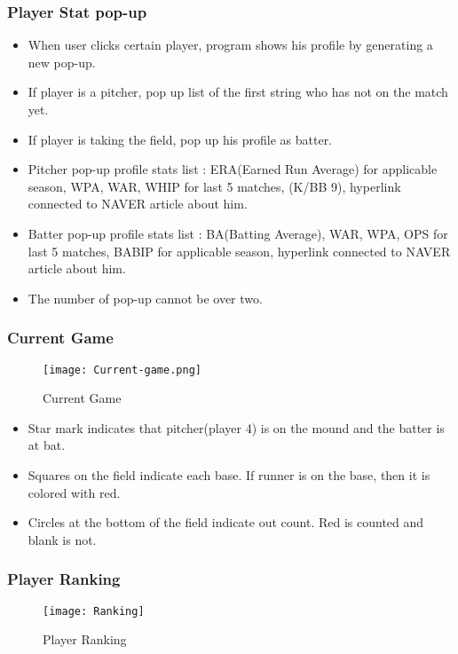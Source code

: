 \documentclass[conference,compsoc, twocolumn]{IEEEtran}
\begin{document}
\subsubsection{Player Stat pop-up}
\begin{itemize}
\item When user clicks certain player, program shows his profile by generating a new pop-up.
\item If player is a pitcher, pop up list of the first string who has not on the match yet.
\item If player is taking the field, pop up his profile as batter.
\item Pitcher pop-up profile stats list : ERA(Earned Run Average) for applicable season, WPA, WAR, WHIP for last 5 matches, (K/BB 9), hyperlink connected to NAVER article about him.
\item Batter pop-up profile stats list : BA(Batting Average), WAR, WPA, OPS for last 5 matches, BABIP for applicable season, hyperlink connected to NAVER article about him.
\item The number of pop-up cannot be over two.
\end{itemize}


\subsubsection{Current Game}
\begin{figure}[h]
\centering\texttt{[image: Current-game.png]}
\caption{Current Game}
\end{figure}

\begin{itemize}
\item Star mark indicates that pitcher(player 4) is on the mound and the batter is at bat.
\item Squares on the field indicate each base. If runner is on the base, then it is colored with red.
\item Circles at the bottom of the field indicate out count. Red is counted and blank is not.
\end{itemize}


\subsubsection{Player Ranking}
\begin{figure}[h]
\centering\texttt{[image: Ranking]}
\caption{Player Ranking}
\end{figure}
\end{document}
